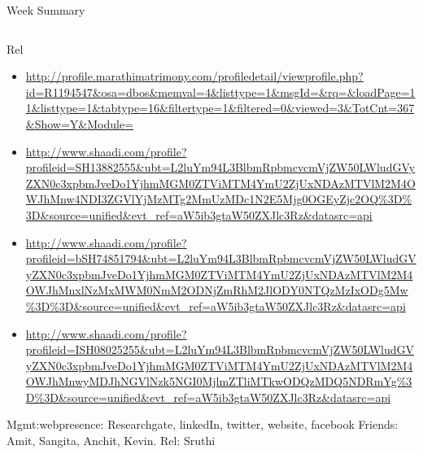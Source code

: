 \documentclass[serif, mathserif, final]{beamer}
\begin{document}
\begin{frame}
\begin{columns}
\begin{column}{0.5\linewidth}
\begin{block}{Week Summary}
\begin{column}{0.25\linewidth}
\begin{block}{Rel}
\begin{itemize}
\item \small \url{http://profile.marathimatrimony.com/profiledetail/viewprofile.php?id=R1194547&osa=dbos&memval=4&listtype=1&msgId=&rq=&loadPage=11&listtype=1&tabtype=16&filtertype=1&filtered=0&viewed=3&TotCnt=367&Show=Y&Module=}

\item \small \url{http://www.shaadi.com/profile?profileid=SH13882555&ubt=L2luYm94L3BlbmRpbmcvcmVjZW50LWludGVyZXN0c3xpbmJveDo1YjhmMGM0ZTViMTM4YmU2ZjUxNDAzMTVlM2M4OWJhMnw4NDI3ZGVlYjMzMTg2MmUzMDc1N2E5Mjg0OGEyZjc2OQ\%3D\%3D&source=unified&evt_ref=aW5ib3gtaW50ZXJlc3Rz&datasrc=api}

\item \small \url{http://www.shaadi.com/profile?profileid=bSH74851794&ubt=L2luYm94L3BlbmRpbmcvcmVjZW50LWludGVyZXN0c3xpbmJveDo1YjhmMGM0ZTViMTM4YmU2ZjUxNDAzMTVlM2M4OWJhMnxlNzMxMWM0NmM2ODNjZmRhM2JlODY0NTQzMzIxODg5Mw\%3D\%3D&source=unified\&evt_ref=aW5ib3gtaW50ZXJlc3Rz&datasrc=api}

\item \small \url{http://www.shaadi.com/profile?profileid=ISH08025255&ubt=L2luYm94L3BlbmRpbmcvcmVjZW50LWludGVyZXN0c3xpbmJveDo1YjhmMGM0ZTViMTM4YmU2ZjUxNDAzMTVlM2M4OWJhMnwyMDJhNGVlNzk5NGI0MjlmZTliMTkwODQzMDQ5NDRmYg\%3D\%3D&source=unified&evt_ref=aW5ib3gtaW50ZXJlc3Rz&datasrc=api} 
\end{itemize} 
\end{block} 

\begin{block} 
Mgmt:webpresence: 
Researchgate, linkedIn, twitter, website, facebook 
Friends: Amit, Sangita, Anchit, Kevin. 
Rel: Sruthi 
\end{block} 
\end{column}%







\end{block}
\end{column}
\end{columns}
\end{frame}
\end{document}

